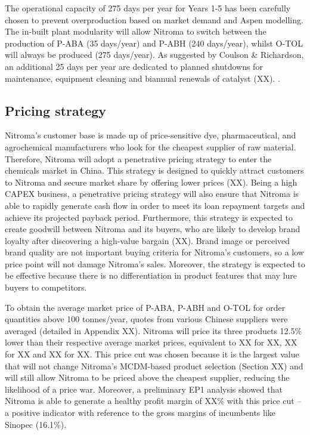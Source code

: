 The operational capacity of 275 days per year for Years 1-5 has been carefully chosen to prevent overproduction based on market demand and Aspen modelling. The in-built plant modularity will allow Nitroma to switch between the production of P-ABA (35 days/year) and P-ABH (240 days/year), whilst O-TOL will always be produced (275 days/year). As suggested by Coulson \& Richardson, an additional 25 days per year are dedicated to planned shutdowns for maintenance, equipment cleaning and biannual renewals of catalyst (XX). . 

\subsection{Pricing strategy}
\label{sec:pricing-strategy}
Nitroma’s customer base is made up of price-sensitive dye, pharmaceutical, and agrochemical manufacturers who look for the cheapest supplier of raw material. Therefore, Nitroma will adopt a penetrative pricing strategy to enter the chemicals market in China. This strategy is designed to quickly attract customers to Nitroma and secure market share by offering lower prices (XX). Being a high CAPEX business, a penetrative pricing strategy will also ensure that Nitroma is able to rapidly generate cash flow in order to meet its loan repayment targets and achieve its projected payback period. Furthermore, this strategy is expected to create goodwill between Nitroma and its buyers, who are likely to develop brand loyalty after discovering a high-value bargain (XX). Brand image or perceived brand quality are not important buying criteria for Nitroma’s customers, so a low price point will not damage Nitroma’s sales. Moreover, the strategy is expected to be effective because there is no differentiation in product features that may lure buyers to competitors.

To obtain the average market price of P-ABA, P-ABH and O-TOL for order quantities above 100 tonnes/year, quotes from various Chinese suppliers were averaged (detailed in Appendix XX).  Nitroma will price its three products 12.5\% lower than their respective average market prices, equivalent to XX for XX, XX for XX and XX for XX. This price cut was chosen because it is the largest value that will not change Nitroma’s MCDM-based product selection (Section XX) and will still allow Nitroma to be priced above the cheapest supplier, reducing the likelihood of a price war. Moreover, a preliminary EP1 analysis showed that Nitroma is able to generate a healthy profit margin of XX\% with this price cut – a positive indicator with reference to the gross margins of incumbents like Sinopec (16.1\%). 


